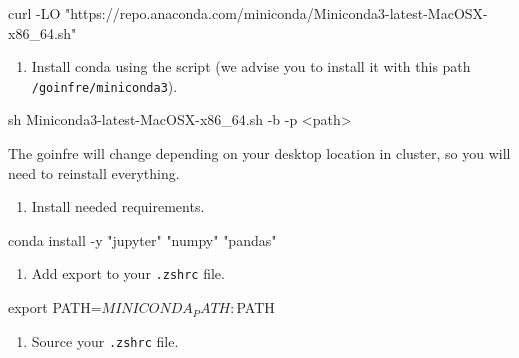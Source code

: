 \documentclass[]{article}
\newenvironment{Shaded}{\begin{snugshade}}{\end{snugshade}}
\newcommand{\NormalTok}[1]{\textcolor[rgb]{0.81,0.81,0.76}{#1}}
\providecommand{\tightlist}{%
  \setlength{\itemsep}{0pt}\setlength{\parskip}{0pt}}
\begin{document}
\begin{Shaded}
\begin{Highlighting}[]
\NormalTok{curl -LO "https://repo.anaconda.com/miniconda/Miniconda3-latest-MacOSX-x86_64.sh"}
\end{Highlighting}
\end{Shaded}

\begin{enumerate}
\def\labelenumi{\arabic{enumi}.}
\setcounter{enumi}{1}
\tightlist
\item
  Install conda using the script (we advise you to install it with this
  path \texttt{/goinfre/miniconda3}).
\end{enumerate}

\begin{Shaded}
\begin{Highlighting}[]
\NormalTok{sh Miniconda3-latest-MacOSX-x86_64.sh -b -p <path>}
\end{Highlighting}
\end{Shaded}

The goinfre will change depending on your desktop location in cluster,
so you will need to reinstall everything.

\begin{enumerate}
\def\labelenumi{\arabic{enumi}.}
\setcounter{enumi}{2}
\tightlist
\item
  Install needed requirements.
\end{enumerate}

\begin{Shaded}
\begin{Highlighting}[]
\NormalTok{conda install -y "jupyter" "numpy" "pandas"}
\end{Highlighting}
\end{Shaded}

\begin{enumerate}
\def\labelenumi{\arabic{enumi}.}
\setcounter{enumi}{3}
\tightlist
\item
  Add export to your \texttt{.zshrc} file.
\end{enumerate}

\begin{Shaded}
\begin{Highlighting}[]
\NormalTok{export PATH=$MINICONDA_PATH:$PATH}
\end{Highlighting}
\end{Shaded}

\begin{enumerate}
\def\labelenumi{\arabic{enumi}.}
\setcounter{enumi}{4}
\tightlist
\item
  Source your \texttt{.zshrc} file.
\end{enumerate}
\end{document}
